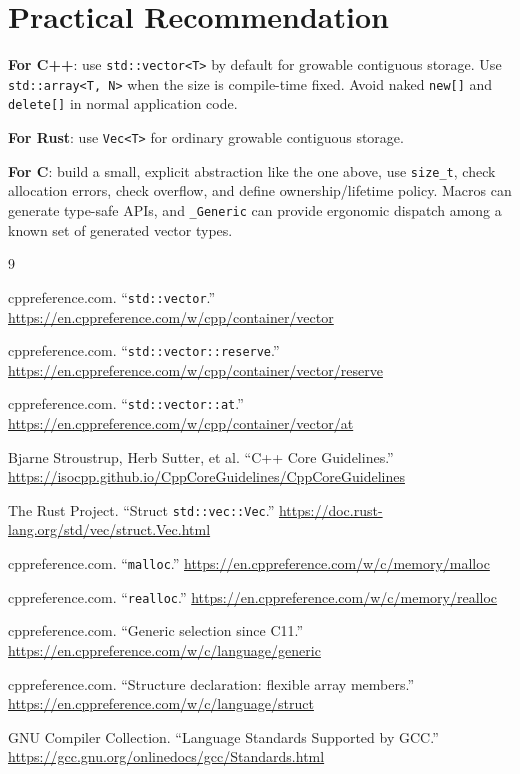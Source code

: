 \documentclass[11pt]{article}
\begin{document}
\section{Practical Recommendation}

\textbf{For C++}: use \texttt{std::vector<T>} by default for growable contiguous storage. Use \texttt{std::array<T, N>} when the size is compile-time fixed. Avoid naked \texttt{new[]} and \texttt{delete[]} in normal application code.

\textbf{For Rust}: use \texttt{Vec<T>} for ordinary growable contiguous storage.

\textbf{For C}: build a small, explicit abstraction like the one above, use \texttt{size\_t}, check allocation errors, check overflow, and define ownership/lifetime policy. Macros can generate type-safe APIs, and \texttt{\_Generic} can provide ergonomic dispatch among a known set of generated vector types.

\begin{thebibliography}{9}
\raggedright

cppreference.com. ``\texttt{std::vector}.'' \url{https://en.cppreference.com/w/cpp/container/vector}

cppreference.com. ``\texttt{std::vector::reserve}.'' \url{https://en.cppreference.com/w/cpp/container/vector/reserve}

cppreference.com. ``\texttt{std::vector::at}.'' \url{https://en.cppreference.com/w/cpp/container/vector/at}

Bjarne Stroustrup, Herb Sutter, et al. ``C++ Core Guidelines.'' \url{https://isocpp.github.io/CppCoreGuidelines/CppCoreGuidelines}

The Rust Project. ``Struct \texttt{std::vec::Vec}.'' \url{https://doc.rust-lang.org/std/vec/struct.Vec.html}

cppreference.com. ``\texttt{malloc}.'' \url{https://en.cppreference.com/w/c/memory/malloc}

cppreference.com. ``\texttt{realloc}.'' \url{https://en.cppreference.com/w/c/memory/realloc}

cppreference.com. ``Generic selection since C11.'' \url{https://en.cppreference.com/w/c/language/generic}

cppreference.com. ``Structure declaration: flexible array members.'' \url{https://en.cppreference.com/w/c/language/struct}

GNU Compiler Collection. ``Language Standards Supported by GCC.'' \url{https://gcc.gnu.org/onlinedocs/gcc/Standards.html}

\end{thebibliography}
\end{document}
